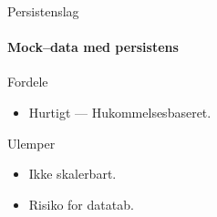 \begin{frame}{Persistenslag}
  \framesubtitle{Mock--data med persistens}
  \begin{beamerboxesrounded}[upper=headerCol,lower=bodyCol,shadow=true]{Fordele}
    \begin{itemize}
      \item Hurtigt --- Hukommelsesbaseret.
    \end{itemize}
  \end{beamerboxesrounded}
  \pause
  \begin{beamerboxesrounded}[upper=headerCol,lower=bodyCol,shadow=true]{Ulemper}
    \begin{itemize}
      \item Ikke skalerbart.
      \item Risiko for datatab.
    \end{itemize}
  \end{beamerboxesrounded}
\end{frame}